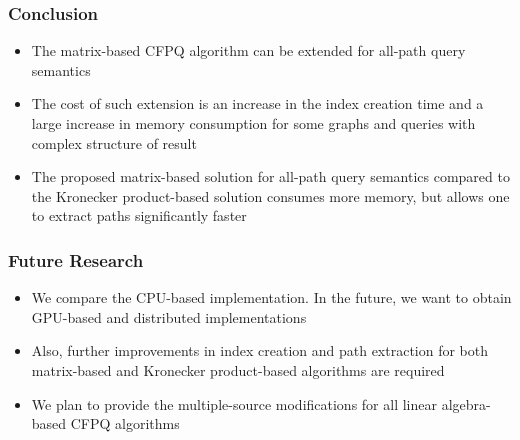 \documentclass[xcolor=table,aspectratio=169]{beamer}
\begin{document}
\begin{frame}[fragile] \frametitle{Conclusion}
  \begin{itemize}
    \item The matrix-based CFPQ algorithm can be extended for all-path query semantics
    \pause
    \item The cost of such extension is an increase in the index creation time and a large increase in memory consumption for some graphs and queries with complex structure of result
    \pause
    \item The proposed matrix-based solution for all-path query semantics compared to the Kronecker product-based solution consumes more memory, but allows one to extract paths significantly faster 
  \end{itemize}
    
    
\end{frame}

\begin{frame}[fragile] \frametitle{Future Research}
  \begin{itemize}
  	\item We compare the CPU-based implementation. In the future, we
  	want to obtain GPU-based and distributed implementations 
  	\item Also, further improvements in index creation and path extraction
  	for both matrix-based and Kronecker product-based algorithms are
  	required
    \item We plan to provide the multiple-source
    modifications for all linear algebra-based CFPQ algorithms
\end{itemize}
\end{frame}
\end{document}
